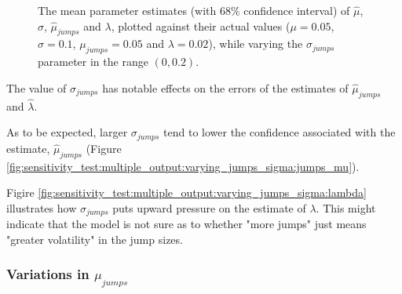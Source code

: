\documentclass[11pt,oneside,openany,a4paper,english, report, goldenblock
]{usthesis}
\begin{document}
\begin{figure}[h]
{\begin{subfloatrow}
			\end{subfloatrow}}{
	\caption{The mean parameter estimates (with $68\%$ confidence interval) of $\hat{\mu}$, $\hat{\sigma}$, $\hat{\mu}_{jumps}$ and $\lambda$, plotted against their actual values ($\mu = 0.05$, $\sigma = 0.1$, $\mu_{jumps} = 0.05$ and $\lambda = 0.02$), while varying the $\sigma_{jumps}$ parameter in the range $\left(0, 0.2\right)$.}
		\label{fig:sensitivity_test:multiple_output:varying_jumps_sigma}}
		\end{figure}

The value of $\sigma_{jumps}$ has notable effects on the errors of the estimates of $\hat{\mu}_{jumps}$ and $\hat{\lambda}$.

As to be expected, larger $\sigma_{jumps}$ tend to lower the confidence associated with the estimate, $\hat{\mu}_{jumps}$ (Figure \ref{fig:sensitivity_test:multiple_output:varying_jumps_sigma:jumps_mu}).

Figire \ref{fig:sensitivity_test:multiple_output:varying_jumps_sigma:lambda} illustrates how $\sigma_{jumps}$ puts upward pressure on the estimate of $\lambda$. This might indicate that the model is not sure as to whether "more jumps" just means "greater volatility" in the jump sizes.

\subsubsection{Variations in $\mu_{jumps}$}
\end{document}

